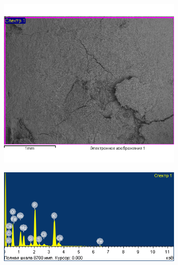 \begin{figure}[H]
	\centering
	\includegraphics[width=0.8\textwidth]{media/pish/image51}
	\caption*{}
\end{figure}

\begin{figure}[H]
	\centering
	\includegraphics[width=0.8\textwidth]{media/pish/image50}
	\caption*{}
\end{figure}


